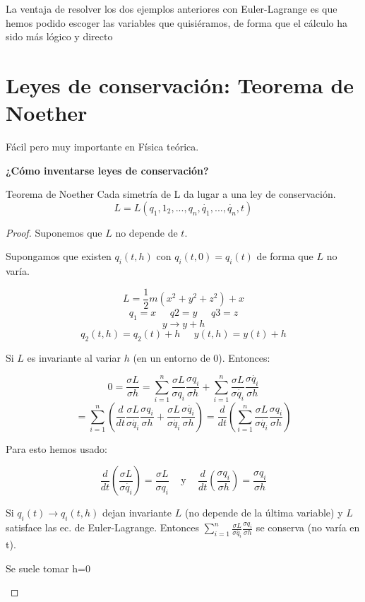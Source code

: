 La ventaja de resolver los dos ejemplos anteriores con Euler-Lagrange es que hemos podido escoger las variables que quisiéramos, de forma que el cálculo ha sido más lógico y directo\\



\section{Leyes de conservación: Teorema de Noether}
Fácil pero muy importante en Física teórica.

\textbf{¿Cómo inventarse leyes de conservación?}

\begin{theorem}{Teorema de Noether}
Cada simetría de L da lugar a una ley de conservación.
$$ L = L(q_1,1_2,...,q_n,\dot{q_1},...,\dot{q_n},t) $$

\begin{proof}
Suponemos que $L$ no depende de $t$.

Supongamos que existen $q_i(t,h)$ con $q_i(t,0) = q_i(t)$ de forma que $L$ no varía.

$$ L = \frac{1}{2} m (x^2 + y^2 + z^2 ) + x $$
$$ q_1 = x \;\;\;\;\; q2 = y \;\;\;\;\; q3 = z $$
$$ y \rightarrow y + h $$
$$ q_2(t,h) = q_2(t) + h \;\;\;\;\;  y(t,h) = y(t) + h $$

Si $L$ es invariante al variar $h$ (en un entorno de 0). Entonces:

$$0 = \frac{\sigma L}{\sigma h} = \sum_{i = 1}^n \frac{\sigma L}{\sigma q_i} \frac{\sigma q_i}{\sigma h} + \sum_{i = 1}^n \frac{\sigma L}{\sigma \dot{q_i}} \frac{\sigma \dot{q_i}}{\sigma h}
$$
$$= \sum_{i = 1}^n (\frac{d}{dt} \frac{\sigma L}{\sigma \dot{q_i}} \frac{\sigma q_i}{\sigma h} + \frac{\sigma L}{\sigma \dot{q_i}} \frac{\sigma \dot{q_i}}{\sigma h})
= \frac{d}{dt} (\sum_{i = 1}^n \frac{\sigma L}{\sigma \dot{q_i}} \frac{\sigma q_i}{\sigma h})$$

Para esto hemos usado:

$$ \frac{d}{dt}( \frac{\sigma L}{\sigma \dot{q_i}}) =  \frac{\sigma L}{\sigma q_i} \;\;\; \text{ y } \;\;\; \frac{d}{dt}( \frac{\sigma q_i}{\sigma h}) = \frac{\sigma q_i}{\sigma h}$$


Si $q_i(t) \rightarrow q_i(t,h)$ dejan invariante $L$ (no depende de la última variable) y $L$ satisface las ec. de Euler-Lagrange. Entonces $\sum_{i = 1}^n \frac{\sigma L}{\sigma \dot{q_i}} \frac{\sigma q_i}{\sigma h}$ se conserva (no varía en t).

\begin{obs} Se suele tomar h=0 \end{obs}

\end{proof}

\end{theorem}

